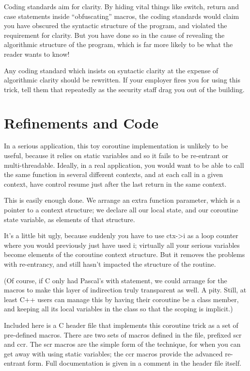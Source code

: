 \documentclass[12pt]{article}
\begin{document}
\begin{CJK}{UTF8}{bsmi}
Coding standards aim for clarity. By hiding vital things like switch, return and case statements inside ``obfuscating'' macros, the coding standards would claim you have obscured the syntactic structure of the program, and violated the requirement for clarity. But you have done so in the cause of revealing the algorithmic structure of the program, which is far more likely to be what the reader wants to know!

Any coding standard which insists on syntactic clarity at the expense of algorithmic clarity should be rewritten. If your employer fires you for using this trick, tell them that repeatedly as the security staff drag you out of the building.
\section{Refinements and Code}

In a serious application, this toy coroutine implementation is unlikely to be useful, because it relies on static variables and so it fails to be re-entrant or multi-threadable. Ideally, in a real application, you would want to be able to call the same function in several different contexts, and at each call in a given context, have control resume just after the last return in the same context.

This is easily enough done. We arrange an extra function parameter, which is a pointer to a context structure; we declare all our local state, and our coroutine state variable, as elements of that structure.

It's a little bit ugly, because suddenly you have to use ctx->i as a loop counter where you would previously just have used i; virtually all your serious variables become elements of the coroutine context structure. But it removes the problems with re-entrancy, and still hasn't impacted the structure of the routine.

(Of course, if C only had Pascal's with statement, we could arrange for the macros to make this layer of indirection truly transparent as well. A pity. Still, at least C++ users can manage this by having their coroutine be a class member, and keeping all its local variables in the class so that the scoping is implicit.)

Included here is a C header file that implements this coroutine trick as a set of pre-defined macros. There are two sets of macros defined in the file, prefixed scr and ccr. The scr macros are the simple form of the technique, for when you can get away with using static variables; the ccr macros provide the advanced re-entrant form. Full documentation is given in a comment in the header file itself.


\end{CJK}
\end{document}
